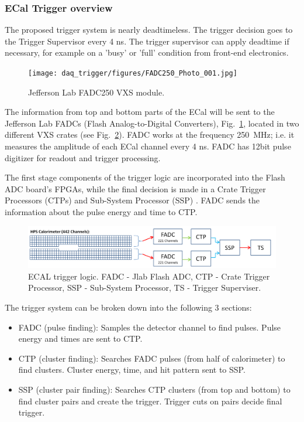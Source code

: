 
\subsubsection{ECal Trigger overview}


The proposed trigger system is nearly deadtimeless. The trigger decision goes to the Trigger Supervisor every 4 ns. The trigger supervisor can apply deadtime if necessary, for example on a 'busy' or 'full' condition from front-end electronics.


\begin{figure}[t]
\texttt{[image: daq\_trigger/figures/FADC250\_Photo\_001.jpg]}
\caption{\small{Jefferson Lab FADC250 VXS module.}}
\label{fig:fadc}
\end{figure}

The information from top and bottom parts of the ECal will be sent to the Jefferson Lab FADCs (Flash Analog-to-Digital Converters), Fig.~\ref{fig:fadc},  located in two different VXS crates (see Fig.~\ref{fig:hps_trigger_cal}). FADC  works at the frequency 250~MHz; i.e. it measures the amplitude of each ECal channel every 4 ns. FADC has 12bit pulse digitizer for readout and trigger processing. 

The first stage components of the trigger logic are incorporated into the Flash ADC board's FPGAs, while the final decision is made in a Crate Trigger Processors (CTPs) and  Sub-System Processor (SSP) .
FADC sends the information about the pulse energy and time to CTP.


\begin{figure}[t]
\includegraphics[scale=0.25]{daq_trigger/figures/hps_trigger_cal}
\caption{\small{ECAL trigger logic. FADC - Jlab Flash ADC, CTP - Crate Trigger Processor, SSP - Sub-System Processor, TS - Trigger Superviser.}}
\label{fig:hps_trigger_cal}
\end{figure}

The trigger system can be broken down into the following 3 sections:
 \begin{itemize}
 \item FADC (pulse finding): Samples the detector channel to find pulses. Pulse energy and times are sent to CTP.
 \item CTP (cluster finding): Searches FADC pulses (from half of calorimeter) to find clusters. Cluster energy, time, and hit pattern sent to SSP.
 \item SSP (cluster pair finding): Searches CTP clusters (from top and bottom) to find cluster pairs and create the trigger. Trigger cuts on pairs decide final trigger.
 \end{itemize}
 
